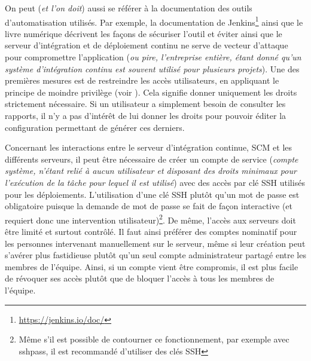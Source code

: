 
On peut (\emph{et l'on doit}) aussi se référer à la documentation des outils d'automatisation utilisés. Par exemple, la documentation de Jenkins\footnote{\url{https://jenkins.io/doc/}} ainsi que le livre numérique  \cite[chapitre 7, Sécuriser Jenkins]{jenkins-guide} décrivent les façons de sécuriser l'outil et éviter ainsi que le serveur d'intégration et de déploiement continu ne serve de vecteur d'attaque pour compromettre l'application (\emph{ou pire, l'entreprise entière, étant donné qu'un système d'intégration continu est souvent utilisé pour plusieurs projets}). Une des premières mesures est de restreindre les accès utilisateurs, en appliquant le principe de moindre privilège (voir  \cite{anssi-least-privilege}). Cela signifie donner uniquement les droits strictement nécessaire. Si un utilisateur a simplement besoin de consulter les rapports, il n'y a pas d'intérêt de lui donner les droits pour pouvoir éditer la configuration permettant de générer ces derniers.

Concernant les interactions entre le serveur d'intégration continue, \gls{SCM} et les différents serveurs, il peut être nécessaire de créer un compte de service (\emph{compte système, n'étant relié à aucun utilisateur et disposant des droits minimaux pour l'exécution de la tâche pour lequel il est utilisé}) avec des accès par clé \gls{SSH} utilisés pour les déploiements. L'utilisation d'une clé \gls{SSH} plutôt qu'un mot de passe est obligatoire puisque la demande de mot de passe se fait de façon interactive (et requiert donc une intervention utilisateur)\footnote{Même s'il est possible de contourner ce fonctionnement, par exemple avec sshpass, il est recommandé d'utiliser des clés \gls{SSH}}. De même, l'accès aux serveurs doit être limité et surtout contrôlé. Il faut ainsi préférer des comptes nominatif pour les personnes intervenant manuellement sur le serveur, même si leur création peut s'avérer plus fastidieuse plutôt qu'un seul compte administrateur partagé entre les membres de l'équipe. Ainsi, si un compte vient être compromis, il est plus facile de révoquer ses accès plutôt que de bloquer l'accès à tous les membres de l'équipe.

